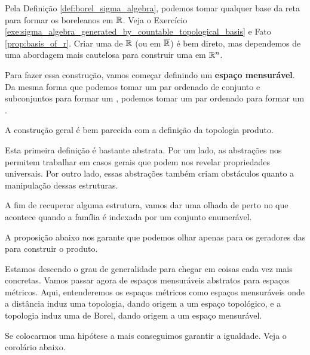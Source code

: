 \borelSigmaAlgebra

Pela Definição \ref{def:borel_sigma_algebra}, podemos tomar qualquer base da reta para formar os boreleanos em $\mathbb{R}$. Veja o Exercício \ref{exe:sigma_algebra_generated_by_countable_topological_basis} e Fato \ref{prop:basis_of_r}. Criar uma \sigmaAlg de $\mathbb{R}$ (ou em $\overline{\mathbb{R}}$) é bem direto, mas dependemos de uma abordagem mais cautelosa para construir uma \sigmaAlg em $\mathbb{R}^n$.

Para fazer essa construção, vamos começar definindo um \textbf{espaço mensurável}. Da mesma forma que podemos tomar um par ordenado de conjunto e subconjuntos para formar um , podemos tomar um par ordenado para formar um .

\measurableSpace

A construção geral é bem parecida com a definição da topologia produto.

\productSigmaAlgebra

Esta primeira definição é bastante abstrata. Por um lado, as abstrações nos permitem trabalhar em casos gerais que podem nos revelar propriedades universais. Por outro lado, essas abstrações também criam obstáculos quanto a manipulação dessas estruturas.

A fim de recuperar alguma estrutura, vamos dar uma olhada de perto no que acontece quando a família é indexada por um conjunto enumerável.

\productSigmaAlgebraOfCountableFamily

A proposição abaixo nos garante que podemos olhar apenas para os geradores das \sigmaAlgs para construir o produto.

\productSigmaAlgebraOfFamiliesGeneratedBySet

\productSigmaAlgebraOfCountableGeneratedFamilies

Estamos descendo o grau de generalidade para chegar em coisas cada vez mais concretas. Vamos passar agora de espaços mensuráveis abstratos para espaços métricos. Aqui, entenderemos os espaços métricos como espaços mensuráveis onde a distância induz uma topologia, dando origem a um espaço topológico, e a topologia induz uma \sigmaAlg de Borel, dando origem a um espaço mensurável.

\productSigmaAlgebraOfMetricSpaces

Se colocarmos uma hipótese a mais conseguimos garantir a igualdade. Veja o corolário abaixo.

\productSigmaAlgebraOfSeparableMetricSpaces


